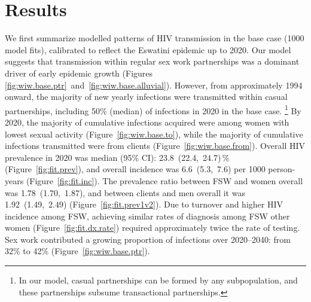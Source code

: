 \section{Results}\label{art.res}
We first summarize modelled patterns of HIV transmission in the base case (1000 model fits),
calibrated to reflect the Eswatini epidemic up to 2020.
Our model suggests that transmission within regular sex work partnerships
was a dominant driver of early epidemic growth
(Figures \ref{fig:wiw.base.ptr}~and~\ref{fig:wiw.base.alluvial}).
However, from approximately 1994 onward,
the majority of new yearly infections were transmitted within casual partnerships, %
including 50\% (median) of infections in 2020 in the base case.%
\footnote{In our model, casual partnerships can be formed by any subpopulation,
  and these partnerships subsume transactional partnerships.}
By 2020, the majority of cumulative infections acquired
were among women with lowest sexual activity (Figure~\ref{fig:wiw.base.to}),
while the majority of cumulative infections transmitted
were from clients (Figure~\ref{fig:wiw.base.from}).
Overall HIV prevalence in 2020 was median (95\% CI):
23.8~(22.4,~24.7)\,\% (Figure~\ref{fig:fit.prev}), %
and overall incidence was 6.6~(5.3,~7.6) per 1000 person-years (Figure~\ref{fig:fit.inc}).
The prevalence ratio between FSW and women overall was 1.78~(1.70,~1.87), %
and between clients and men overall it was 1.92~(1.49,~2.49) %
(Figure~\ref{fig:fit.prev1v2}).
Due to turnover and higher HIV incidence among FSW,
achieving similar rates of diagnosis among FSW \vs other women (Figure~\ref{fig:fit.dx.rate})
required approximately twice the rate of testing. %
Sex work contributed a growing proportion of infections
over 2020--2040: from 32\% to 42\% (Figure~\ref{fig:wiw.base.ptr}). %
